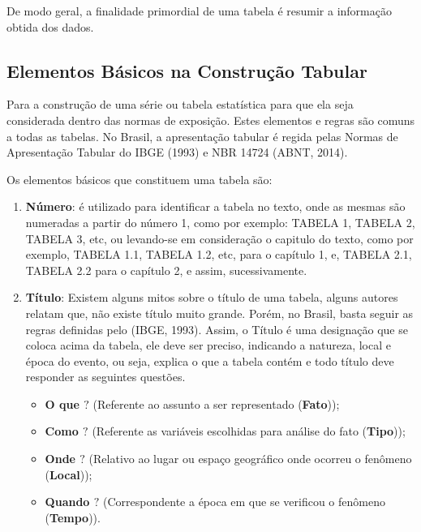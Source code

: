 De modo geral, a finalidade primordial de uma tabela é resumir a informação obtida dos dados.

\subsection{Elementos Básicos na Construção Tabular}

\inic Para a construção de uma série ou tabela estatística para que ela seja considerada dentro das normas de exposição. Estes elementos e regras são comuns a todas as tabelas. No Brasil, a apresentação tabular é regida pelas Normas de Apresentação Tabular do IBGE (1993) e NBR 14724 (ABNT, 2014).\vskip0.3cm


Os elementos básicos que constituem uma tabela são:

\begin{enumerate}
  \item \textbf{Número}: é utilizado para identificar a tabela no texto, onde as mesmas são numeradas a partir do número 1, como por exemplo: TABELA 1, TABELA 2, TABELA 3, etc, ou levando-se em consideração o capitulo do texto, como por exemplo, TABELA 1.1, TABELA 1.2, etc, para o capítulo 1, e, TABELA 2.1, TABELA 2.2 para o capítulo 2, e assim, sucessivamente.
  \item \textbf{Título}: Existem alguns mitos sobre o título de uma tabela, alguns autores relatam que, não existe título muito grande. Porém, no Brasil, basta seguir as regras definidas pelo (IBGE, 1993). Assim, o Título é uma designação que se coloca acima da tabela, ele deve ser preciso,
  indicando a natureza, local e época do evento, ou seja, explica o que a tabela contém e todo título deve responder as seguintes questões.

\begin{itemize}
  \item \textbf{O que $?$}  (Referente ao assunto a ser representado (\textbf{Fato}));
  \item \textbf{Como $?$}  (Referente as variáveis escolhidas para análise do fato (\textbf{Tipo}));
   \item \textbf{Onde $?$}   (Relativo ao lugar ou espaço geográfico onde ocorreu o fenômeno (\textbf{Local}));
    \item \textbf{Quando $?$} (Correspondente a época em que se verificou o fenômeno (\textbf{Tempo})).
\end{itemize}


\end{enumerate}
